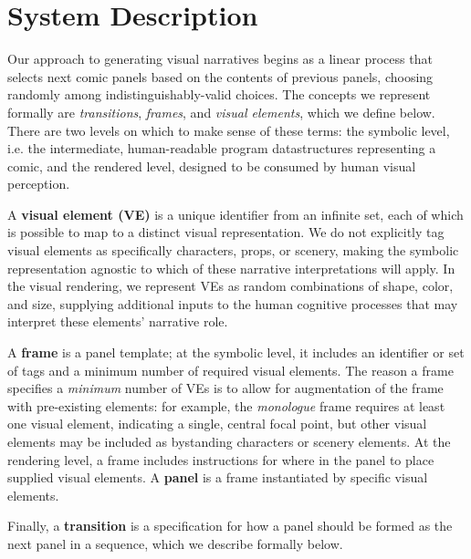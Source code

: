 \section{System Description}

Our approach to generating visual narratives begins as a linear
process that selects next comic panels based on the contents of previous
panels, choosing randomly among indistinguishably-valid choices.
The concepts we represent formally are {\em transitions}, {\em frames}, and
{\em visual elements}, which we define below. There are two levels on which
to make sense of these terms: the symbolic level, i.e. the intermediate,
human-readable program datastructures representing a comic, and the
rendered level, designed to be consumed by human visual perception.

A {\bf visual element (VE)} is a unique identifier from an infinite set,
each of which is possible to map to a distinct visual representation.
We do not explicitly tag visual elements as specifically characters, props,
or scenery, making the symbolic representation agnostic to which of these narrative
interpretations will apply. In the visual rendering, we represent VEs as
random combinations of shape, color, and size, supplying additional inputs
to the human cognitive processes that may interpret these elements'
narrative role.

A {\bf frame} is a panel template; at the symbolic level, it
includes an identifier or set of tags and a minimum number of required
visual elements. The reason a frame specifies a {\em minimum} number of VEs
is to allow for augmentation of the frame with pre-existing elements: for
example, the {\em monologue} frame requires at least one visual element,
indicating a single, central focal point, but other visual elements may be
included as bystanding characters or scenery elements.
At the rendering level, a frame includes instructions for where in the
panel to place supplied visual elements.
A {\bf panel} is a frame instantiated by specific visual elements.


Finally, a {\bf transition} is a specification for how a panel should be
formed as the next panel in a sequence, which we describe formally below.


